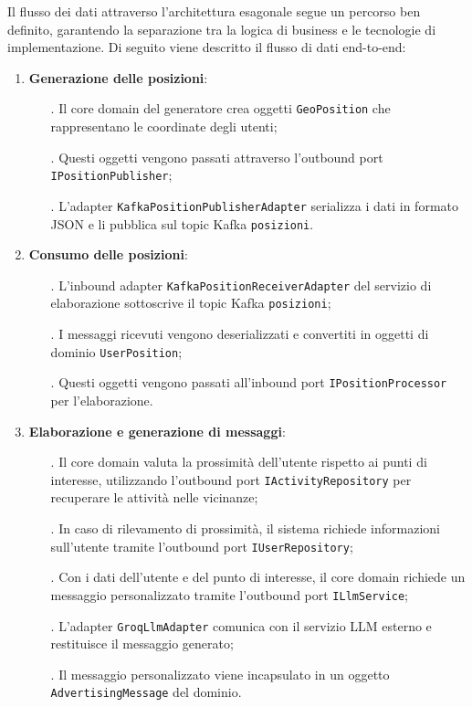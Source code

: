 \documentclass[10pt]{article}
\begin{document}
    Il flusso dei dati attraverso l'architettura esagonale segue un percorso ben definito, garantendo la separazione tra la logica di business e le tecnologie di implementazione. Di seguito viene descritto il flusso di dati end-to-end:

    \begin{enumerate}
        \item \textbf{Generazione delle posizioni}:
        \begin{itemize}
            \item[.] Il core domain del generatore crea oggetti \texttt{GeoPosition} che rappresentano le coordinate degli utenti;
            \item[.] Questi oggetti vengono passati attraverso l'outbound port \texttt{IPositionPublisher};
            \item[.] L'adapter \texttt{KafkaPositionPublisherAdapter} serializza i dati in formato JSON e li pubblica sul topic Kafka \texttt{posizioni}.
        \end{itemize}

        \item \textbf{Consumo delle posizioni}:
        \begin{itemize}
            \item[.] L'inbound adapter \texttt{KafkaPositionReceiverAdapter} del servizio di elaborazione sottoscrive il topic Kafka \texttt{posizioni};
            \item[.] I messaggi ricevuti vengono deserializzati e convertiti in oggetti di dominio \texttt{UserPosition};
            \item[.] Questi oggetti vengono passati all'inbound port \texttt{IPositionProcessor} per l'elaborazione.
        \end{itemize}

        \item \textbf{Elaborazione e generazione di messaggi}:
        \begin{itemize}
            \item[.] Il core domain valuta la prossimità dell'utente rispetto ai punti di interesse, utilizzando l'outbound port \texttt{IActivityRepository} per recuperare le attività nelle vicinanze;
            \item[.] In caso di rilevamento di prossimità, il sistema richiede informazioni sull'utente tramite l'outbound port \texttt{IUserRepository};
            \item[.] Con i dati dell'utente e del punto di interesse, il core domain richiede un messaggio personalizzato tramite l'outbound port \texttt{ILlmService};
            \item[.] L'adapter \texttt{GroqLlmAdapter} comunica con il servizio LLM esterno e restituisce il messaggio generato;
            \item[.] Il messaggio personalizzato viene incapsulato in un oggetto \texttt{AdvertisingMessage} del dominio.
        \end{itemize}


\end{enumerate}
\end{document}
